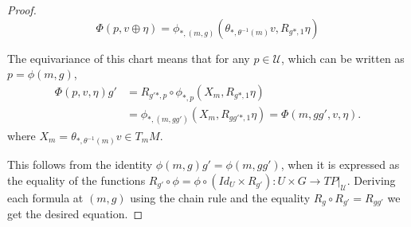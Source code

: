 \begin{proof}
\[
    \Phi(p, v \oplus \eta) = \phi_{*, (m, g)}(\theta_{*, \theta^{-1}(m)} v, R_{g*, 1} \eta)
\]

The equivariance of this chart%
 means that for any $p \in \mathcal U$, which can be written as $p = \phi(m, g)$,
\begin{align*}
    \Phi(p, v, \eta) g' &=R_{g'*, p} \circ \phi_{*, p}(X_m, R_{g*, 1} \eta)\\
    &= \phi_{*, (m, gg')}(X_m, R_{gg'*, 1} \eta) = \Phi(m, gg', v, \eta).
\end{align*} where $X_m = \theta_{*, \theta^{-1}(m)} v \in T_m M$.

This follows from the identity $\phi(m, g) g' = \phi(m, gg')$, when it is expressed as the equality of the functions $R_{g'} \circ \phi = \phi \circ (Id_U \times R_{g'}) : U \times G \to TP|_{\mathcal U}$. Deriving each formula at $(m, g)$ using the chain rule and the equality $R_g \circ R_{g'} = R_{gg'}$ we get the desired equation.%


\end{proof}

